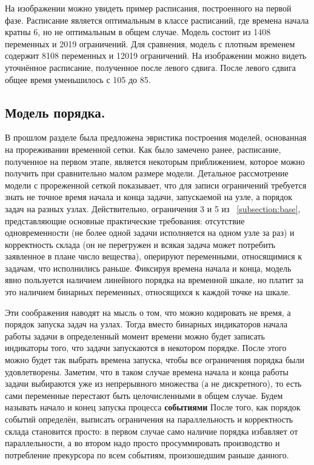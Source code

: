 \documentclass[12pt, twoside]{article}
\theoremstyle{definition}
\begin{document}
На изображении \cite{fig:first_phase_wb} можно увидеть пример расписания, построенного на первой фазе. Расписание является оптимальным в классе расписаний, где времена начала кратны 6, но не оптимальным в общем случае. Модель состоит из 1408 переменных и 2019 ограничений. Для сравнения, модель с плотным временем содержит 8108 переменных и 12019 ограничений. На изображении \cite{fig:second_phase_wb} можно видеть уточнённое расписание, полученное после левого сдвига. После левого сдвига общее время уменьшилось с 105 до 85.

\subsection{Модель порядка.}

В прошлом разделе была предложена эвристика построения моделей, основанная на прореживании временной сетки. Как было замечено ранее, расписание, полученное на первом этапе, является некоторым приближением, которое можно получить при сравнительно малом размере модели. Детальное рассмотрение модели с прореженной сеткой показывает, что для записи ограничений требуется знать не точное время начала и конца задачи, запускаемой на узле, а порядок задач на разных узлах. Действительно, ограничения 3 и 5 из ~\ref{subsection:base}, представляющие основные практические требования: отсутствие одновременности (не более одной задачи исполняется на одном узле за раз) и корректность склада (он не перегружен и всякая задача может потребить заявленное в плане число вещества), оперируют переменными, относящимися к задачам, что исполнились раньше. Фиксируя времена начала и конца, модель явно пользуется наличием линейного порядка на временной шкале, но платит за это наличием бинарных переменных, относящихся к каждой точке на шкале.

Эти соображения наводят на мысль о том, что можно кодировать не время, а порядок запуска задач на узлах. Тогда вместо бинарных индикаторов начала работы задачи в определенный момент времени можно будет записать индикаторы того, что задачи запускаются в некотором порядке. После этого можно будет так выбрать времена запуска, чтобы все ограничения порядка были удовлетворены. Заметим, что в таком случае времена начала и конца работы задачи выбираются уже из непрерывного множества (а не дискретного), то есть сами переменные перестают быть целочисленными в общем случае. Будем называть начало и конец запуска процесса \textbf{событиями} После того, как порядок событий определён, выписать ограничения на параллельность и корректность склада становится просто: в первом случае само наличие порядка избавляет от параллельности, а во втором надо просто просуммировать производство и потребление прекурсора по всем событиям, произошедшим раньше данного.
\end{document}
